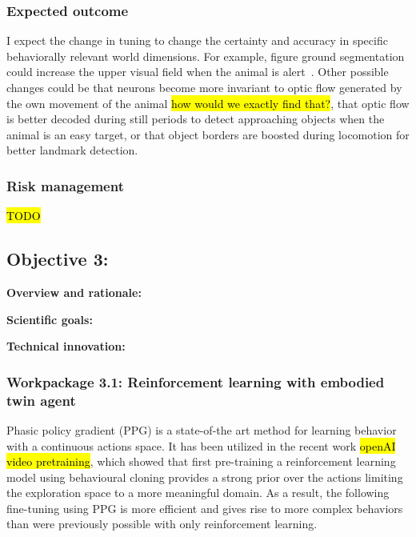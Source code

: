 \documentclass[B2,COG]{ercgrant}
\begin{document}
\subsubsection{Expected outcome} 
I expect the change in tuning to change the certainty and accuracy in specific behaviorally relevant world dimensions. 
For example, figure ground segmentation could increase the upper visual field when the animal is alert~\parencite[similar to findings in ][]{Franke2022-do}.
Other possible changes could be that neurons become more invariant to optic flow generated by the own movement of the animal \hl{how would we exactly find that?}, that optic flow is better decoded during still periods to detect approaching objects when the animal is an easy target, or that object borders are boosted during locomotion for better landmark detection. 

\subsubsection{Risk management} 
\hl{TODO}



\subsection{\colorbox{obj3}{\color{white}Objective 3}:}
\label{sub:obj3}

\textbf{Overview and rationale:} 

\textbf{Scientific goals:} 

\textbf{Technical innovation:} 


\subsubsection{Workpackage 3.1: Reinforcement learning with embodied twin agent\hfill{}}
Phasic policy gradient (PPG) is a state-of-the art method for learning behavior with a continuous actions space. It has been utilized in the recent work \hl{openAI video pretraining}, which showed that first pre-training a reinforcement learning model using behavioural cloning provides a strong prior over the actions limiting the exploration space to a more meaningful domain. As a result, the following fine-tuning using PPG is more efficient and gives rise to more complex behaviors than were previously possible with only reinforcement learning.
\end{document}
